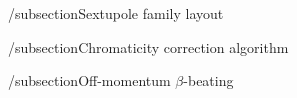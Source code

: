 /subsection{Sextupole family layout}

/subsection{Chromaticity correction algorithm}

/subsection{Off-momentum $\beta$-beating}
